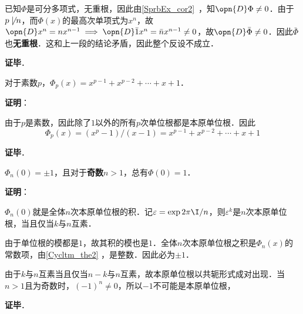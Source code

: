 已知$\Phi$是可分多项式，无重根，因此由\autoref{SprbEx_cor2}~，知$\opn{D}\Phi\neq 0$．由于$p\not\mid n$，而$\Phi(x)$的最高次单项式为$x^n$，故$\opn{D}x^n=nx^{n-1}\implies \opn{D} \bar{1}x^n=\bar{n}x^{n-1}\neq 0$，故$\opn{D}\bar{\Phi}\neq 0$．因此$\bar{\Phi}$也\textbf{无重根}．这和上一段的结论矛盾，因此整个反设不成立．

\textbf{证毕}．



\begin{theorem}{}
对于素数$p$，$\Phi_p(x)=x^{p-1}+x^{p-2}+\cdots+x+1$．
\end{theorem}

\textbf{证明}：

由于$p$是素数，因此除了$1$以外的所有$p$次单位根都是本原单位根．因此
\begin{equation}
\Phi_p(x) = (x^p-1)/(x-1) = x^{p-1}+x^{p-2}+\cdots+x+1
\end{equation}

\textbf{证毕}．






\begin{theorem}{}
$\Phi_n(0)=\pm 1$，且对于\textbf{奇数}$n>1$，总有$\Phi(0)=1$．
\end{theorem}

\textbf{证明}：

$\Phi_n(0)$就是全体$n$次本原单位根的积．记$\varepsilon=\exp{2\pi\I/n}$，则$\varepsilon^k$是$n$次本原单位根，当且仅当$k$与$n$互素．

由于单位根的模都是$1$，故其积的模也是$1$．全体$n$次本原单位根之积是$\Phi_n(x)$的常数项，由\autoref{Cycltm_the2} ，是整数．因此必为$\pm 1$．

由于$k$与$n$互素当且仅当$n-k$与$n$互素，故本原单位根以共轭形式成对出现．当$n>1$且为奇数时，$(-1)^n\neq 0$，所以$-1$不可能是本原单位根，

\textbf{证毕}．





























